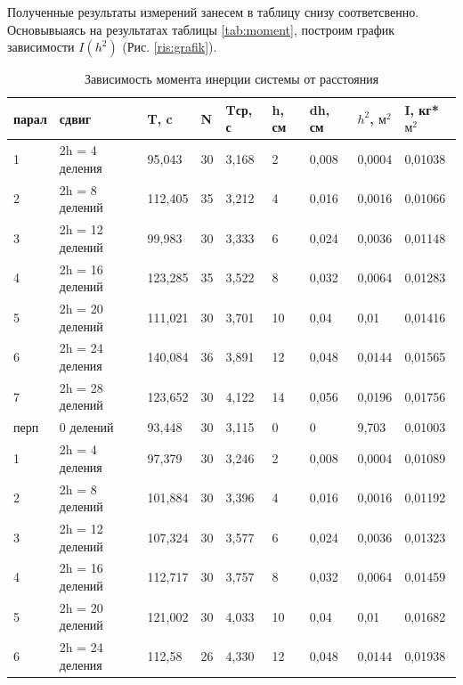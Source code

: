 \documentclass[a4paper,14pt]{extarticle}
\begin{document}
	Полученные результаты измерений занесем в таблицу снизу соответсвенно. Основывыаясь на результатах таблицы \eqref{tab:moment}, построим график зависимости $ I(h^{2}) $ (Рис. \ref{ris:grafik}).
	\bigskip\bigskip\bigskip\bigskip\bigskip
	
	\begin{table}[!ht]
		\centering
		\vspace{-3em}
		\begin{tabular}{|l|l|l|l|l|l|l|l|l|}
			\hline
			парал & сдвиг & T, c & N & Tср, с & h, см & dh, см & $h^2$, $\text{м}^2$ & I, кг*$\text{м}^2$ \\ \hline
			1 & 2h = 4 деления & 95,043 & 30 & 3,168 & 2 & 0,008 & 0,0004 & 0,01038 \\ \hline
			2 & 2h = 8 делений & 112,405 & 35 & 3,212 & 4 & 0,016 & 0,0016 & 0,01066 \\ \hline
			3 & 2h = 12 делений & 99,983 & 30 & 3,333 & 6 & 0,024 & 0,0036 & 0,01148 \\ \hline
			4 & 2h = 16 делений & 123,285 & 35 & 3,522 & 8 & 0,032 & 0,0064 & 0,01283 \\ \hline
			5 & 2h = 20 делений & 111,021 & 30 & 3,701 & 10 & 0,04 & 0,01 & 0,01416 \\ \hline
			6 & 2h = 24 деления & 140,084 & 36 & 3,891 & 12 & 0,048 & 0,0144 & 0,01565 \\ \hline
			7 & 2h = 28 делений & 123,652 & 30 & 4,122 & 14 & 0,056 & 0,0196 & 0,01756 \\ \hline
			перп & 0 делений & 93,448 & 30 & 3,115 & 0 & 0 & 9,703 & 0,01003 \\ \hline
			1 & 2h = 4 деления & 97,379 & 30 & 3,246 & 2 & 0,008 & 0,0004 & 0,01089 \\ \hline
			2 & 2h = 8 делений & 101,884 & 30 & 3,396 & 4 & 0,016 & 0,0016 & 0,01192 \\ \hline
			3 & 2h = 12 делений & 107,324 & 30 & 3,577 & 6 & 0,024 & 0,0036 & 0,01323 \\ \hline
			4 & 2h = 16 делений & 112,717 & 30 & 3,757 & 8 & 0,032 & 0,0064 & 0,01459 \\ \hline
			5 & 2h = 20 делений & 121,002 & 30 & 4,033 & 10 & 0,04 & 0,01 & 0,01682 \\ \hline
			6 & 2h = 24 деления & 112,58 & 26 & 4,330 & 12 & 0,048 & 0,0144 & 0,01938 \\ \hline
		\end{tabular}
		\caption{Зависимость момента инерции системы от расстояния}
		\label{tab:moment}
	\end{table}
	
\end{document}
